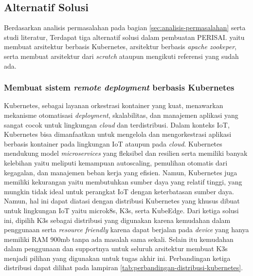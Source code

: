 \subsection{Alternatif Solusi}
\label{sec:analisis-solusi}

Berdasarkan analisis permasalahan pada bagian \ref{sec:analisis-permasalahan} serta studi literatur, Terdapat tiga alternatif solusi dalam pembuatan PERISAI. yaitu membuat arsitektur berbasis Kubernetes, arsitektur berbasis \textit{apache zookeper}, serta membuat arsitektur dari \textit{scratch} ataupun mengikuti referensi yang sudah ada.

\subsubsection{Membuat sistem \textit{remote deployment} berbasis Kubernetes}
Kubernetes, sebagai layanan orkestrasi kontainer yang kuat, menawarkan mekanisme otomatisasi \textit{deployment}, skalabilitas, dan manajemen aplikasi yang sangat cocok untuk lingkungan \textit{cloud} dan terdistribusi. Dalam konteks IoT, Kubernetes bisa dimanfaatkan untuk mengelola dan mengorkestrasi aplikasi berbasis kontainer pada lingkungan IoT ataupun pada \textit{cloud}. Kubernetes mendukung model \textit{microservices} yang fleksibel dan resilien serta memiliki banyak kelebihan yaitu  meliputi kemampuan autoscaling, pemulihan otomatis dari kegagalan, dan manajemen beban kerja yang efisien. Namun, Kubernetes juga memiliki kekurangan yaitu membutuhkan sumber daya yang relatif tinggi, yang mungkin tidak ideal untuk perangkat IoT dengan keterbatasan sumber daya. Namun, hal ini dapat diatasi dengan distribusi Kubernetes yang khusus dibuat untuk lingkungan IoT yaitu microk8s, K3s, serta KubeEdge. Dari ketiga solusi ini, dipilih K3s sebagai distribusi yang digunakan karena kemudahan dalam penggunaan serta \textit{resource friendly} karena dapat berjalan pada \textit{device} yang hanya memiliki RAM 900mb tanpa ada masalah sama sekali. Selain itu kemudahan dalam penggunaan dan supportnya untuk seluruh arsitektur membuat K3s menjadi pilihan yang digunakan untuk tugas akhir ini. Perbandingan ketiga distribusi dapat dilihat pada lampiran \ref{tab:perbandingan-distribusi-kubernetes}.

